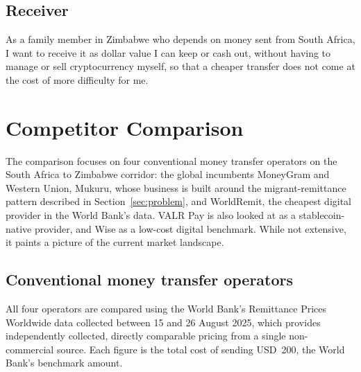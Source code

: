 \documentclass[11pt,a4paper]{article}
\begin{document}
\subsection{Receiver}
As a family member in Zimbabwe who depends on money sent from South Africa, I want to receive it as dollar value I can keep or cash out, without having to manage or sell cryptocurrency myself, so that a cheaper transfer does not come at the cost of more difficulty for me.

\section{Competitor Comparison}\label{sec:competitors}

The comparison focuses on four conventional money transfer operators on the South Africa to Zimbabwe corridor: the global incumbents MoneyGram and Western Union, Mukuru, whose business is built around the migrant-remittance pattern described in Section~\ref{sec:problem}, and WorldRemit, the cheapest digital provider in the World Bank's data. VALR Pay is also looked at as a stablecoin-native provider, and Wise as a low-cost digital benchmark. While not extensive, it paints a picture of the current market landscape.

\subsection{Conventional money transfer operators}
All four operators are compared using the World Bank's Remittance Prices Worldwide data collected between 15 and 26 August 2025, which provides independently collected, directly comparable pricing from a single non-commercial source. Each figure is the total cost of sending USD~200, the World Bank's benchmark amount.
\end{document}
